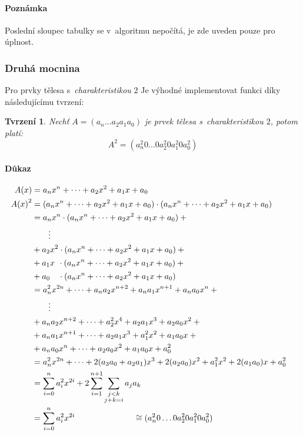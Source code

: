 \documentclass[thesis=M,czech,hidelinks]{FITthesis}[2012/06/26]
\newcommand{\0}{{\textcolor[gray]{0.100}{0}}}
\newtheorem{tvrzeni}{Tvrzení}
\begin{document}
\paragraph{Poznámka} Poslední sloupec tabulky se v~algoritmu nepočítá, je zde
uveden pouze pro úplnost.


\subsubsection{Druhá mocnina}
Pro prvky tělesa s~\emph{charakteristikou} $2$ Je výhodné implementovat funkci
 díky následujícímu tvrzení:


\begin{tvrzeni}
    Nechť $A=(a_n \dots a_2 a_1 a_0)$ je prvek tělesa
    s~\emph{charakteristikou} $2$, potom platí:
    $$ A^2 = (a_n^2 0 \dots 0 a_2^2 0 a_1^2 0 a_0^2) $$
\end{tvrzeni}

\paragraph{Důkaz}
\begin{align*}
    A(x)     &=  a_n x^n + \dots + a_2 x^2 + a_1 x + a_0 \\
    {A(x)}^2 &=  (a_n x^n + \dots + a_2 x^2 + a_1 x + a_0)\cdot(a_n x^n + \dots + a_2 x^2 + a_1 x + a_0) \\
             &= a_n x^n   \cdot (a_n x^n + \dots + a_2 x^2 + a_1 x + a_0) + {} \\
             & \qquad \vdots \\
             &  {} + a_2 x^2   \cdot (a_n x^n + \dots + a_2 x^2 + a_1 x + a_0) + {} \\
             &  {} + a_1 x \, \:  \cdot (a_n x^n + \dots + a_2 x^2 + a_1 x + a_0) + {} \\
             &  {} + a_0 \quad \cdot (a_n x^n + \dots + a_2 x^2 + a_1 x + a_0) \\
             &= a_n^2 x^{2n}    + \dots + a_n a_2 x^{n+2} + a_n a_1 x^{n+1} + a_n a_0 x^n + {} \\
             & \qquad \vdots \\
             &  {} + a_n a_2 x^{n+2} + \dots + a_2^2 x^4       + a_2 a_1 x^3     + a_2 a_0 x^2 + {} \\
             &  {} + a_n a_1 x^{n+1} + \dots + a_2 a_1 x^3     + a_1^2 x^2       + a_1 a_0 x   + {} \\
             &  {} + a_n a_0 x^n     + \dots + a_2 a_0 x^2     + a_1 a_0 x       + a_0^2            \\
             &= a_n^2 x^{2n} + \dots  + 2 ( a_3 a_0 + a_2 a_1 ) x^3  + 2 ( a_2 a_0 ) x^2 + a_1^2 x^2 + 2 ( a_1 a_0 ) x + a_0^2  \\
             &= \sum_{i=0}^{n} a_i^2 x^{2i} + 2 \sum_{i=1}^{n+1}\sum_{\substack{
    j<k \\ j+k = i }} a_j a_k &\\
             &= \sum_{i=0}^{n} a_i^2 x^{2i}
    \hspace{2.5cm} \cong (a_n^2 0 \dots 0 a_2^2 0 a_1^2 0 a_0^2)
\end{align*}
\end{document}
